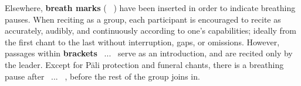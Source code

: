 
Elsewhere, \textbf{breath marks} ( \abbrbreathmark\ ) have been inserted in order to indicate breathing pauses. When reciting as a group, each participant is encouraged to recite as accurately, audibly, and continuously according to one's capabilities; ideally from the first chant to the last without interruption, gaps, or omissions. However, passages within \textbf{brackets} \anglebracketleft\ \hspace{-0.5mm}... \hspace{-0.8mm}\anglebracketright\ serve as an introduction, and are recited only by the leader. Except for Pāli protection and funeral chants, there is a breathing pause after \anglebracketleft\ \hspace{-0.5mm}... \hspace{-0.8mm}\anglebracketright\ , before the rest of the group joins in.

\clearpage


